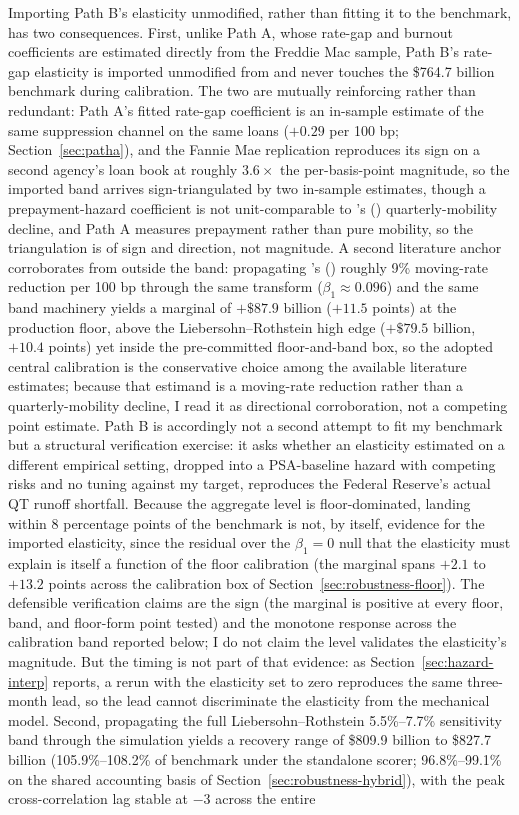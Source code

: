 \documentclass[12pt]{article}
\newcommand{\citepos}[1]{\citeauthor{#1}'s (\citeyear{#1})}
\begin{document}
Importing Path B's elasticity unmodified, rather than fitting it to the benchmark, has two consequences. First, unlike Path A, whose rate-gap and burnout coefficients are estimated directly from the Freddie Mac sample, Path B's rate-gap elasticity is imported unmodified from \citet{liebersohn2024} and never touches the \$764.7 billion benchmark during calibration. The two are mutually reinforcing rather than redundant: Path A's fitted rate-gap coefficient is an in-sample estimate of the same suppression channel on the same loans ($+0.29$ per 100 bp; Section~\ref{sec:patha}), and the Fannie Mae replication reproduces its sign on a second agency's loan book at roughly $3.6\times$ the per-basis-point magnitude, so the imported band arrives sign-triangulated by two in-sample estimates, though a prepayment-hazard coefficient is not unit-comparable to \citepos{liebersohn2024} quarterly-mobility decline, and Path A measures prepayment rather than pure mobility, so the triangulation is of sign and direction, not magnitude. A second literature anchor corroborates from outside the band: propagating \citepos{fonseca2024} roughly 9\% moving-rate reduction per 100 bp through the same transform ($\beta_1 \approx 0.096$) and the same band machinery yields a marginal of $+\$87.9$ billion ($+11.5$ points) at the production floor, above the Liebersohn--Rothstein high edge ($+\$79.5$ billion, $+10.4$ points) yet inside the pre-committed floor-and-band box, so the adopted central calibration is the conservative choice among the available literature estimates; because that estimand is a moving-rate reduction rather than a quarterly-mobility decline, I read it as directional corroboration, not a competing point estimate. Path B is accordingly not a second attempt to fit my benchmark but a structural verification exercise: it asks whether an elasticity estimated on a different empirical setting, dropped into a PSA-baseline hazard with competing risks and no tuning against my target, reproduces the Federal Reserve's actual QT runoff shortfall. Because the aggregate level is floor-dominated, landing within 8 percentage points of the benchmark is not, by itself, evidence for the imported elasticity, since the residual over the $\beta_1 = 0$ null that the elasticity must explain is itself a function of the floor calibration (the marginal spans $+2.1$ to $+13.2$ points across the calibration box of Section~\ref{sec:robustness-floor}). The defensible verification claims are the sign (the marginal is positive at every floor, band, and floor-form point tested) and the monotone response across the calibration band reported below; I do not claim the level validates the elasticity's magnitude. But the timing is not part of that evidence: as Section~\ref{sec:hazard-interp} reports, a rerun with the elasticity set to zero reproduces the same three-month lead, so the lead cannot discriminate the elasticity from the mechanical model. Second, propagating the full Liebersohn--Rothstein 5.5\%--7.7\% sensitivity band through the simulation yields a recovery range of \$809.9 billion to \$827.7 billion (105.9\%--108.2\% of benchmark under the standalone scorer; 96.8\%--99.1\% on the shared accounting basis of Section~\ref{sec:robustness-hybrid}), with the peak cross-correlation lag stable at $-3$ across the entire 
\end{document}
